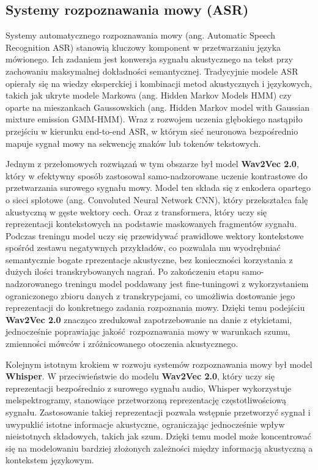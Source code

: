 \subsection{Systemy rozpoznawania mowy (ASR)}

Systemy automatycznego rozpoznawania mowy (ang. Automatic Speech Recognition ASR) stanowią kluczowy komponent w przetwarzaniu języka mówionego. Ich zadaniem jest konwersja sygnału akustycznego na tekst przy zachowaniu maksymalnej dokładności semantycznej. Tradycyjnie modele ASR opierały się na wiedzy eksperckiej i kombinacji metod akustycznych i językowych, takich jak ukryte modele Markowa (ang. Hidden Markov Models HMM) czy oparte na mieszankach Gaussowskich (ang. Hidden Markov model with Gaussian mixture emission GMM-HMM). Wraz z rozwojem uczenia głębokiego nastąpiło przejściu w kierunku end-to-end ASR, w którym sieć neuronowa bezpośrednio mapuje sygnał mowy na sekwencję znaków lub tokenów tekstowych.

Jednym z przełomowych rozwiązań w tym obszarze był model \textbf{Wav2Vec 2.0}\cite{baevski2020wav2vec}, który w efektywny sposób zastosował samo-nadzorowane uczenie kontrastowe do przetwarzania surowego sygnału mowy. Model ten składa się z enkodera opartego o sieci splotowe (ang. Convoluted Neural Network CNN), który przekształca falę akustyczną w gęste wektory cech. Oraz z transformera, który uczy się reprezentacji kontekstowych na podstawie maskowanych fragmentów sygnału. Podczas treningu model uczy się przewidywać prawidłowe wektory kontekstowe spośród zestawu negatywnych przykładów, co pozwalala mu wyodrębniać semantycznie bogate rprezentacje akustyczne, bez konieczności korzystania z dużych ilości transkrybowanych nagrań.
Po zakończeniu etapu samo-nadzorowanego treningu model poddawany jest fine-tuningowi z wykorzystaniem ograniczonego zbioru danych z transkrypcjami, co umożliwia dostowanie jego reprezentacji do konkretnego zadania rozpoznania mowy. Dzięki temu podejściu \textbf{Wav2Vec 2.0} znacząco zredukował zapotrzebowanie na danie z etykietami, jednocześnie poprawiając jakość rozpoznawania mowy w warunkach szumu, zmienności mówców i zróżnicowanego otoczenia akustycznego. 

Kolejnym istotnym krokiem w rozwoju systemów rozpoznawania mowy był model \textbf{Whisper}\cite{whisper}. W przeciwieństwie do modelu \textbf{Wav2Vec 2.0}, który uczy się reprezentacji bezpośrednio z surowego sygnału audio, Whisper wykorzystuje melspektrogramy, stanowiące przetworzoną reprezentację częstotliwościową sygnału. Zastosowanie takiej reprezentacji pozwala wstępnie przetworzyć sygnał i uwypuklić istotne informacje akustyczne, ograniczając jednocześnie wpływ nieistotnych składowych, takich jak szum. Dzięki temu model może koncentrować się na modelowaniu bardziej złożonych zależności między informacją akustyczną a kontekstem językowym.

